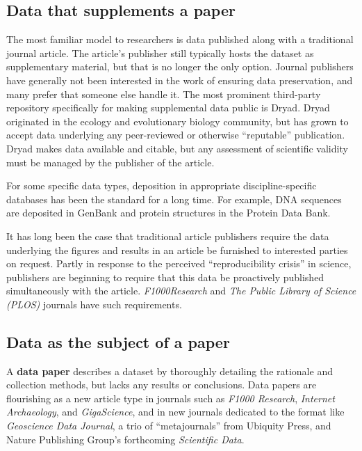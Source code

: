 \documentclass[10pt,a4paper,twocolumn]{article}
\begin{document}
\subsection*{Data that supplements a paper}\label{paper-supplement-data}

The most familiar model to researchers is data published along with a traditional journal article. 
The article's publisher still typically hosts the dataset as supplementary material, but that is no longer the only option.
Journal publishers have generally not been interested in the work of ensuring data preservation, and many prefer that someone else handle it.
The most prominent third-party repository specifically for making supplemental data public is Dryad\cite{dryad}.
Dryad originated in the ecology and evolutionary biology community, but has grown to accept data underlying any peer-reviewed or otherwise ``reputable'' publication. Dryad makes data available and citable, but any assessment of scientific validity must be managed by the publisher of the article. 

For some specific data types, deposition in appropriate discipline-specific databases has been the standard for a long time. 
For example, DNA sequences are deposited in GenBank\cite{genbank} and protein structures in the Protein Data Bank\cite{protein_data_bank}.

It has long been the case that traditional article publishers require the data underlying the figures and results in an article be furnished to interested parties on request.
Partly in response to the perceived ``reproducibility crisis'' \cite{begley_drug_2012}\cite{collins_nih_2014}in science, publishers are beginning to require that this data be proactively published simultaneously with the article.  
\emph{F1000Research} and \emph{The Public Library of Science (PLOS)} journals have such requirements.\cite{bloom_data_2014}




\subsection*{Data as the subject of a paper}\label{paper-subject-data}

A \textbf{data paper} describes a dataset by thoroughly detailing the rationale and collection methods, but lacks any results or conclusions. 
Data papers are flourishing as a new article type in journals such as \emph{F1000 Research}\cite{f1000_research}, \emph{Internet Archaeology}\cite{internet_archaeology}, and \emph{GigaScience}\cite{gigascience}, and in new journals dedicated to the format like \emph{Geoscience Data Journal}\cite{geoscience_data_journal}, a trio of ``metajournals'' from Ubiquity Press\cite{ubiquity_press_metajournals}, and Nature Publishing Group's forthcoming \emph{Scientific Data}\cite{nature_scientific_data}.
\end{document}
